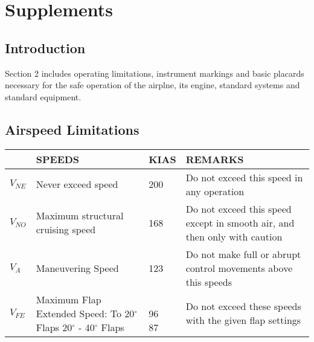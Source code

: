 \chapter{Supplements}
\thispagestyle{fancy}
\minitoc[n] %

\section{Introduction}
Section 2 includes operating limitations, instrument markings and basic placards necessary for the safe operation of the airplne, its engine, standard systems and standard equipment.

\section{Airspeed Limitations}


\begin{center}
\begin{tabular}{ |p{1cm}|p{6cm}|p{2cm}|p{5cm}| } 
 \hline
  & SPEEDS &  KIAS & REMARKS\\ 
 \hline
 $V_{NE}$ & Never exceed speed & 200 & Do not exceed this speed in any operation\\ 
 \hline
 $V_{NO}$ & Maximum structural cruising speed & 168  & Do not exceed this speed except in smooth air, and then only with caution\\ 
 \hline
 $V_{A}$ & Maneuvering Speed & 123  & Do not make full or abrupt control movements above this speeds \\ 
 \hline
 $V_{FE}$  & \shortstack[l]{Maximum Flap Extended Speed: \\To 20$^{\circ}$ Flaps\\ 20$^{\circ}$ - 40$^{\circ}$ Flaps} & \shortstack[l]{\\96 \\ 87} & Do not exceed these speeds with the given flap settings \\ 
 \hline
\end{tabular}
\end{center}


